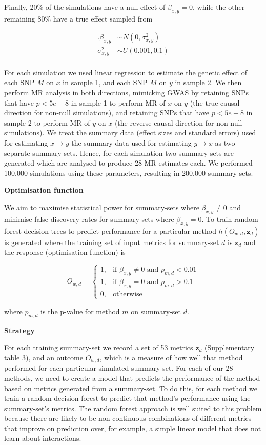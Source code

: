 \documentclass[]{article}
\begin{document}
Finally, 20\% of the simulations have a null effect of
\(\beta_{x,y} = 0\), while the other remaining 80\% have a true effect
sampled from

\[
\begin{aligned}.
\beta_{x,y} & \sim N(0, \sigma^2_{x,y}) \\
\sigma^2_{x,y} & \sim U(0.001, 0.1) \\
\end{aligned}
\]

For each simulation we used linear regression to estimate the genetic
effect of each SNP \(M\) on \(x\) in sample 1, and each SNP \(M\) on
\(y\) in sample 2. We then perform MR analysis in both directions,
mimicking GWAS by retaining SNPs that have \(p < 5e-8\) in sample 1 to
perform MR of \(x\) on \(y\) (the true causal direction for non-null
simulations), and retaining SNPs that have \(p < 5e-8\) in sample 2 to
perform MR of \(y\) on \(x\) (the reverse causal direction for non-null
simulations). We treat the summary data (effect sizes and standard
errors) used for estimating \(x \rightarrow y\) the summary data used
for estimating \(y \rightarrow x\) as two separate summary-sets. Hence,
for each simulation two summary-sets are generated which are analysed to
produce 28 MR estimates each. We performed 100,000 simulations using
these parameters, resulting in 200,000 summary-sets.

\textbf{Optimisation function}

We aim to maximise statistical power for summary-sets where
\(\beta_{x,y} \neq 0\) and minimise false discovery rates for
summary-sets where \(\beta_{x,y} = 0\). To train random forest decision
trees to predict performance for a particular method
\(h(O_{w,d}, \textbf{z}_{d})\) is generated where the training set of
input metrics for summary-set \(d\) is \(\textbf{z}_{d}\) and the
response (optimisation function) is

\[
    O_{w,d} = 
\begin{cases}
    1,   & \text{if } \beta_{x,y} \neq 0 \text{ and } p_{m,d} < 0.01\\
    1,   & \text{if } \beta_{x,y} = 0 \text{ and } p_{m,d} > 0.1 \\
    0,   & \text{otherwise}
\end{cases}
\]

where \(p_{m,d}\) is the p-value for method \(m\) on summary-set \(d\).

\textbf{Strategy}

For each training summary-set we record a set of 53 metrics
\(\textbf{z}_{d}\) (Supplementary table 3), and an outcome \(O_{w,d}\),
which is a measure of how well that method performed for each particular
simulated summary-set. For each of our 28 methods, we need to create a
model that predicts the performance of the method based on metrics
generated from a summary-set. To do this, for each method we train a
random decision forest to predict that method's performance using the
summary-set's metrics. The random forest approach is well suited to this
problem because there are likely to be non-continuous combinations of
different metrics that improve on prediction over, for example, a simple
linear model that does not learn about interactions.
\end{document}

